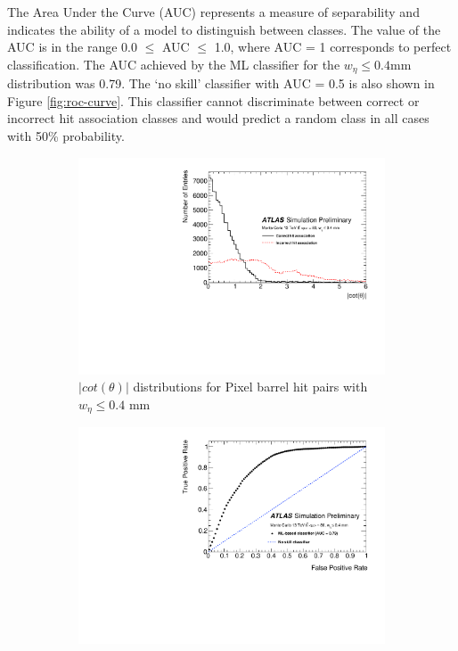 The Area Under the Curve (AUC) represents a measure of separability and indicates the ability of a model to distinguish between classes. The value of the AUC is in the range 0.0 $\leq$ AUC $\leq$ 1.0, where AUC = 1 corresponds to perfect classification. The AUC achieved by the ML classifier for the $w_{\eta} \leq 0.4$mm distribution was 0.79. The ‘no skill’ classifier with AUC = 0.5 is also shown in Figure \ref{fig:roc-curve}. This classifier cannot discriminate between correct or incorrect hit association classes and would predict a random class in all cases with 50\% probability.


\begin{figure}[!htbp]
\centering
    \begin{subfigure}[a]{0.9\textwidth}
        \includegraphics[width=\linewidth]{images/4-ml-based-predictor/histo.pdf}
        \caption{$\lvert cot(\theta) \rvert$ distributions for Pixel barrel hit pairs with $w_{\eta} \leq 0.4$ mm }
        \label{fig:truth-histo}
    \end{subfigure}
    \hfill
    \begin{subfigure}[b]{0.9\textwidth}
        \centering
        \includegraphics[width=\linewidth]{images/4-ml-based-predictor/roc.pdf}

\end{subfigure}
\end{figure}
